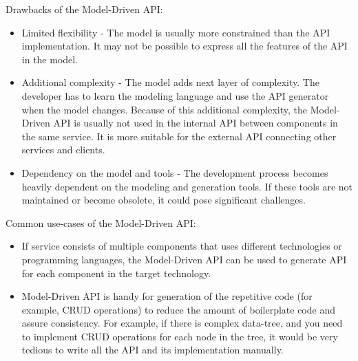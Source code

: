 Drawbacks of the Model-Driven API:

\begin{itemize}
    \item Limited flexibility - The model is usually more constrained than the API implementation.
    It may not be possible to express all the features of the API in the model.
    \item Additional complexity - The model adds next layer of complexity.
    The developer has to learn the modeling language and use the API generator when the model changes.
    Because of this additional complexity, the Model-Driven API is usually not used in the internal API between
    components in the same service.
    It is more suitable for the external API connecting other services and clients.
    \item Dependency on the model and tools - The development process becomes heavily dependent on the modeling and
    generation tools.
    If these tools are not maintained or become obsolete, it could pose significant challenges.
\end{itemize}

Common use-cases of the Model-Driven API:

\begin{itemize}
    \item If service consists of multiple components that uses different technologies or programming languages,
    the Model-Driven API can be used to generate API for each component in the target technology.
    \item Model-Driven API is handy for generation of the repetitive code (for example, CRUD operations)
    to reduce the amount of boilerplate code and assure consistency.
    For example, if there is complex data-tree, and you need to implement CRUD operations for each node in the tree,
    it would be very tedious to write all the API and its implementation manually.
\end{itemize}
